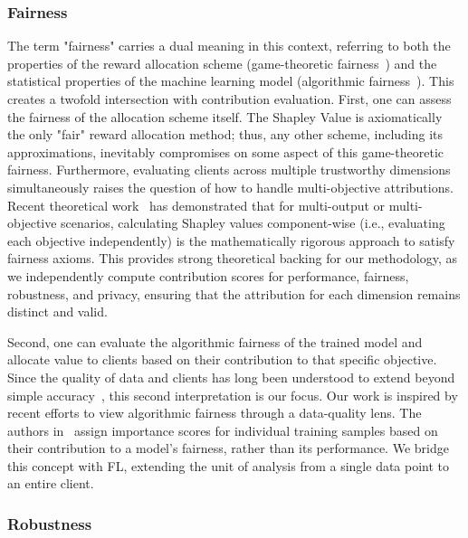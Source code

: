 \documentclass[acmsmall]{acmart}
\begin{document}
\subsubsection*{Fairness}

The term "fairness" carries a dual meaning in this context, referring to both the properties of the reward allocation scheme (game-theoretic fairness~\cite{rabin1993incorporating}) and the statistical properties of the machine learning model (algorithmic fairness~\cite{kleinberg2018algorithmic}). This creates a twofold intersection with contribution evaluation. First, one can assess the fairness of the allocation scheme itself. The Shapley Value is axiomatically the only "fair" reward allocation method; thus, any other scheme, including its approximations, inevitably compromises on some aspect of this game-theoretic fairness. Furthermore, evaluating clients across multiple trustworthy dimensions simultaneously raises the question of how to handle multi-objective attributions. Recent theoretical work~\cite{biccari2026fair} has demonstrated that for multi-output or multi-objective scenarios, calculating Shapley values component-wise (i.e., evaluating each objective independently) is the mathematically rigorous approach to satisfy fairness axioms. This provides strong theoretical backing for our methodology, as we independently compute contribution scores for performance, fairness, robustness, and privacy, ensuring that the attribution for each dimension remains distinct and valid.

Second, one can evaluate the algorithmic fairness of the trained model and allocate value to clients based on their contribution to that specific objective. Since the quality of data and clients has long been understood to extend beyond simple accuracy~\cite{wang1996beyond}, this second interpretation is our focus. Our work is inspired by recent efforts to view algorithmic fairness through a data-quality lens. The authors in~\cite{arnaiztowards} assign importance scores for individual training samples based on their contribution to a model's fairness, rather than its performance. We bridge this concept with FL, extending the unit of analysis from a single data point to an entire client. 

\subsubsection*{Robustness}
\end{document}
